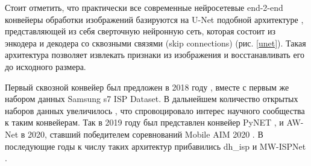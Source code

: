 
Стоит отметить, что практически все современные нейросетевые end-2-end конвейеры обработки изображений базируются на U-Net подобной архитектуре \cite{lib-u-net}, представляющей из себя сверточную нейронную сеть, которая состоит из энкодера и декодера со сквозными связями (skip connections) (рис. \ref{unet}). Такая архитектура позволяет извлекать признаки из изображения и восстанавливать его до исходного размера.

Первый сквозной конвейер был предложен в 2018 году \cite{lib-deep-isp}, вместе с первым же набором данных Samsung s7 ISP Dataset. В дальнейшем количество открытых наборов данных увеличилось \cite{lib-zurich-raw-rgb}, что спровоцировало интерес научного сообщества к таким конвейерам. Так в 2019 году был представлен конвейер PyNET \cite{lib-py-net}, и AW-Net \cite{lib-aw-net} в 2020, ставший победителем соревнований Mobile AIM 2020 \cite{lib-mobile-aim-2020}. В последующие годы к числу таких архитектур прибавились dh\_isp и MW-ISPNet \cite{lib-aim21}.


